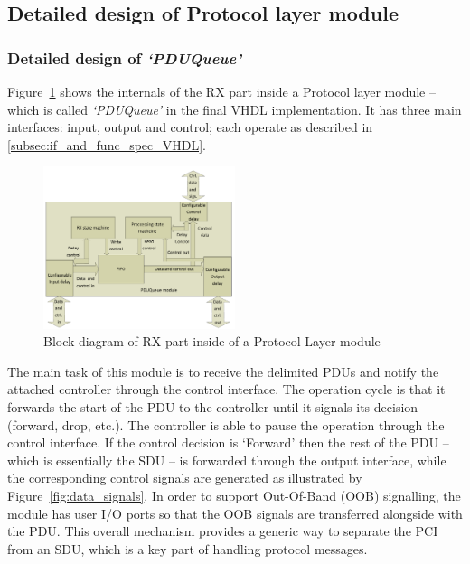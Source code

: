 \documentclass[conference]{IEEEtran}
\begin{document}
\subsection{Detailed design of Protocol layer module}

\subsubsection{Detailed design of \emph{`PDUQueue'}}\label{subsubsec:PDUQueue_details}

Figure~\ref{fig:proto_layer_rx_sch} shows the internals of the RX part inside a Protocol layer module -- which is
called \emph{`PDUQueue'} in the final VHDL implementation. It has three main interfaces: input, output and control;
each operate as described in \ref{subsec:if_and_func_spec_VHDL}.

\begin{figure}[!htb]
    \centering
    \includegraphics[width=0.5\textwidth]{figures_raw/pdu_queue_imp.pdf}
    \caption{Block diagram of RX part inside of a Protocol Layer module}
    \label{fig:proto_layer_rx_sch}
\end{figure}

The main task of this module is to receive the delimited PDUs and notify the attached controller through the control
interface. The operation cycle is that it forwards the start of the PDU to the controller until it signals its decision
(forward, drop, etc.). The controller is able to pause the operation through the control interface. If the control
decision is `Forward' then the rest of the PDU -- which is essentially the SDU -- is forwarded through the output
interface, while the corresponding control signals are generated as illustrated by Figure~\ref{fig:data_signals}. In
order to support Out-Of-Band (OOB) signalling, the module has user I/O ports so that the OOB signals are transferred
alongside with the PDU. This overall mechanism provides a generic way to separate the PCI from an SDU, which is a key
part of handling protocol messages.
\end{document}
